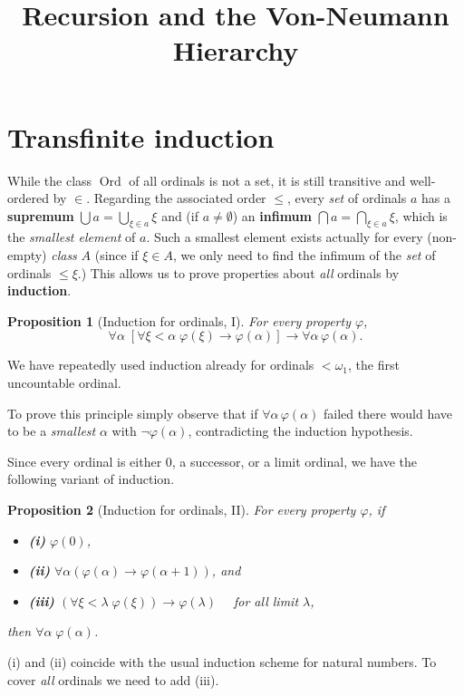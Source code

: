\documentclass{article}
\title{Recursion and the Von-Neumann Hierarchy}
\date{\displaydate{articleDate}}
\author{}
\newcommand{\Ord}{\operatorname{Ord}}
\newtheorem{proposition}{Proposition}[section]
\begin{document}
\maketitle

\section{Transfinite induction}

While the class $\Ord$ of all ordinals is not a set, it is still transitive and well-ordered by $\in$. Regarding the associated order $\leq$, every \textit{set} of ordinals $a$ has a \textbf{supremum} $\bigcup a = \bigcup_{\xi \in a} \xi$ and (if $a \ne \emptyset$) an \textbf{infimum}
$\bigcap a = \bigcap_{\xi \in a} \xi$, which is the \textit{smallest element} of $a$. Such a smallest element exists actually for every (non-empty) \textit{class} $A$ (since if $\xi \in A$, we only need to find the infimum of the \textit{set} of ordinals $\le \xi$.)
This allows us to prove properties about \textit{all} ordinals by \textbf{induction}.

\begin{proposition}[Induction for ordinals, I]\label{prop-induction-ord-i}For every property ${}\varphi$,
\begin{equation*}
\forall \alpha \; [ \forall \xi < \alpha \; \varphi(\xi) \to \varphi(\alpha)] \to \forall \alpha \, \varphi(\alpha).
\end{equation*}
\end{proposition}We have repeatedly used induction already for ordinals $< \omega_1$, the first uncountable ordinal.

To prove this principle simply observe that if $\forall \alpha \, \varphi(\alpha)$ failed there would have to be a \textit{smallest}  ${}\alpha$ with  $\neg \varphi(\alpha)$, contradicting the induction hypothesis.

Since every ordinal is either 0, a successor, or a limit ordinal, we have the following variant of induction.

\begin{proposition}[Induction for ordinals, II]\label{prop-induction-ord-ii}For every property ${}\varphi$, if

\begin{itemize}
\item \textbf{(i)} $\varphi(0)$,
\item \textbf{(ii)} $\forall \alpha (\varphi(\alpha) \to \varphi(\alpha+1))$, and
\item \textbf{(iii)} $(\forall \xi < \lambda \; \varphi(\xi)) \to \varphi(\lambda)\quad$ for all limit $\lambda$,
\end{itemize}

then $\forall \alpha \;  \varphi(\alpha)$.

\end{proposition}(i) and (ii) coincide with the usual induction scheme for natural numbers. To cover \textit{all} ordinals we need to add (iii).
\end{document}

